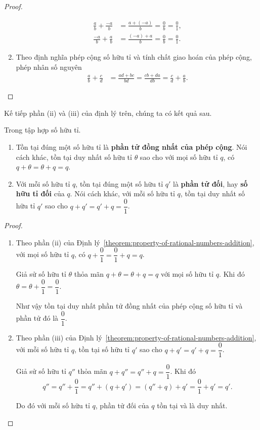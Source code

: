 \begin{proof}
\begin{enumerate}[label={(\roman*)}]
\begin{align*}
                  \frac{a}{b} + \frac{-a}{b} & = \frac{a + (-a)}{b} = \frac{0}{b} = \frac{0}{1}, \\
                  \frac{-a}{b} + \frac{a}{b} & = \frac{(-a) + a}{b} = \frac{0}{b} = \frac{0}{1}.
              \end{align*}
        \item Theo định nghĩa phép cộng số hữu tỉ và tính chất giao hoán của phép cộng, phép nhân số nguyên
              \begin{align*}
                  \frac{a}{b} + \frac{c}{d} & = \frac{ad + bc}{bd} = \frac{cb + da}{db} = \frac{c}{d} + \frac{a}{b}.
              \end{align*}
    \end{enumerate}
\end{proof}

Kế tiếp phần (ii) và (iii) của định lý trên, chúng ta có kết quả sau.
\begin{theorem}\label{theorem:rational-numbers-additive-identity-and-additive-inverse}
    Trong tập hợp số hữu tỉ.
    \begin{enumerate}[label={(\roman*)}]
        \item Tồn tại đúng một số hữu tỉ là \textbf{phần tử đồng nhất của phép cộng}. Nói cách khác, tồn tại duy nhất số hữu tỉ $\theta$ sao cho với mọi số hữu tỉ $q$, có $q + \theta = \theta + q = q$.
        \item Với mỗi số hữu tỉ $q$, tồn tại đúng một số hữu tỉ $q'$ là \textbf{phần tử đối}, hay \textbf{số hữu tỉ đối} của $q$. Nói cách khác, với mỗi số hữu tỉ $q$, tồn tại duy nhất số hữu tỉ $q'$ sao cho $q + q' = q' + q = \dfrac{0}{1}$.
    \end{enumerate}
\end{theorem}

\begin{proof}
    \begin{enumerate}[label={(\roman*)}]
        \item Theo phần (ii) của Định lý~\ref{theorem:property-of-rational-numbers-addition}, với mọi số hữu tỉ $q$, có $q + \dfrac{0}{1} = \dfrac{0}{1} + q = q$.

              Giả sử số hữu tỉ $\theta$ thỏa mãn $q + \theta = \theta + q = q$ với mọi số hữu tỉ $q$. Khi đó $\theta = \theta + \dfrac{0}{1} = \dfrac{0}{1}$.

              Như vậy tồn tại duy nhất phần tử đồng nhất của phép cộng số hữu tỉ và phần tử đó là $\dfrac{0}{1}$.
        \item Theo phần (iii) của Định lý~\ref{theorem:property-of-rational-numbers-addition}, với mỗi số hữu tỉ $q$, tồn tại số hữu tỉ $q'$ sao cho $q + q' = q' + q = \dfrac{0}{1}$.

              Giả sử số hữu tỉ $q''$ thỏa mãn $q + q'' = q'' + q = \dfrac{0}{1}$. Khi đó
              \[
                  q'' = q'' + \frac{0}{1} = q'' + (q + q') = (q'' + q) + q' = \frac{0}{1} + q' = q'.
              \]

              Do đó với mỗi số hữu tỉ $q$, phần tử đối của $q$ tồn tại và là duy nhất.
    \end{enumerate}
\end{proof}

